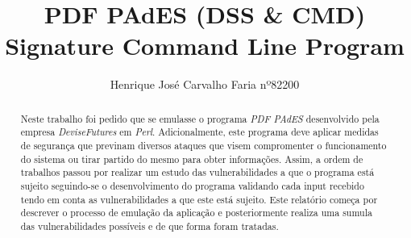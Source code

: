 %
\title{PDF PAdES (DSS \& CMD) Signature Command Line Program}
%
%
\author{ Henrique José Carvalho Faria nº82200 }
%
%
%
\maketitle              %
%
\begin{abstract}


Neste trabalho foi pedido que se emulasse o programa \textit{PDF PAdES} desenvolvido pela empresa \textit{DeviseFutures} em \textit{Perl}. Adicionalmente, este programa deve aplicar medidas de segurança que previnam diversos ataques que visem compromenter o funcionamento do sistema ou tirar partido do mesmo para obter informações. Assim, a ordem de trabalhos passou por realizar um estudo das vulnerabilidades a que o programa está sujeito seguindo-se o desenvolvimento do programa validando cada input recebido tendo em conta as vulnerabilidades a que este está sujeito.
Este relatório começa por descrever o processo de emulação da aplicação e posteriormente realiza uma sumula das vulnerabilidades possíveis e de que forma foram tratadas.


\end{abstract}
%
%
